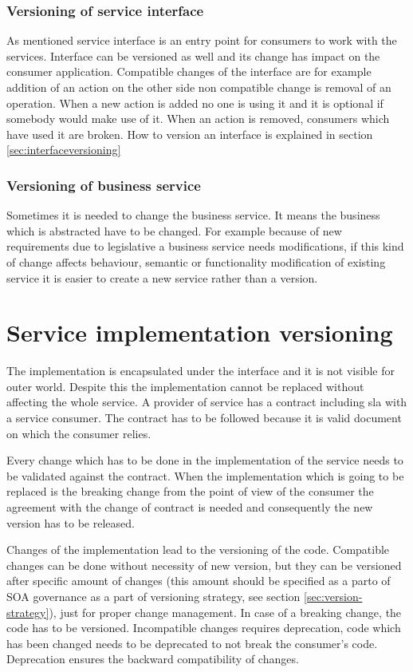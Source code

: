 \subsubsection{\textbf{Versioning of service interface}}
As mentioned service interface is an entry point for consumers to work with the services. Interface can be versioned as well and its change has impact on the consumer application. Compatible changes of the interface are for example addition of an action on the other side non compatible change is removal of an operation. When a new action is added no one is using it and it is optional if somebody would make use of it. When an action is removed, consumers which have used it are broken. How to version an interface is explained in section \ref{sec:interfaceversioning}

\subsubsection{\textbf{Versioning of business service}}
Sometimes it is needed to change the business service. It means the business which is abstracted have to be changed. For example because of new requirements due to legislative a business service needs modifications, if this kind of change affects behaviour, semantic or functionality modification of existing service it is easier to create a new service rather than a version. 

\section{Service implementation versioning}
\label{sec:implversioning}
The implementation is encapsulated under the interface and it is not visible for outer world. Despite this the implementation cannot be replaced without affecting the whole service. A provider of service has a contract including \gls{sla} with a service consumer. The contract has to be followed because it is valid document on which the consumer relies. 

Every change which has to be done in the implementation of the service needs to be validated against the contract. When the implementation which is going to be replaced is the breaking change from the point of view of the consumer the agreement with the change of contract is needed and consequently the new version has to be released.

Changes of the implementation lead to the versioning of the code. Compatible changes can be done without necessity of new version, but they can be versioned after specific amount of changes (this amount should be specified as a parto of SOA governance as a part of versioning strategy, see section \ref{sec:version-strategy}), just for proper change management. In case of a breaking change, the code has to be versioned. Incompatible changes requires \gls{deprecation}, code which has been changed needs to be deprecated to not break the consumer's code. Deprecation ensures the backward compatibility of changes.


